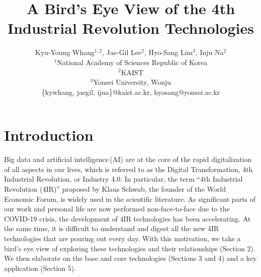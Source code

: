 \documentclass[11pt]{article}
\begin{document}
\title{A Bird’s Eye View of the 4th Industrial Revolution Technologies}
\author{Kyu-Young Whang$^{1,2}$, Jae-Gil Lee$^2$, Hyo-Sang Lim$^3$, Inju Na$^2$ \\
$^1$National Academy of Sciences Republic of Korea \\
$^2$KAIST \\
$^3$Yonsei University, Wonju \\
{\small \{kywhang, jaegil, ijna\}@kaist.ac.kr, hyosang@yonsei.ac.kr}}
\maketitle
\setcounter{page}{4}

\section{Introduction}

Big data and artificial intelligence\,(AI) are at the core of the rapid digitalization of all aspects in our lives, which is referred to as the Digital Transformation, 4th Industrial Revolution, or Industry 4.0. In particular, the term ``4th Industrial Revolution (4IR)'' proposed by Klaus Schwab, the founder of the World Economic Forum, is widely used in the scientific literature. As significant parts of our work and personal life are now performed non-face-to-face due to the COVID-19 crisis, the development of 4IR technologies has been accelerating. At the same time, it is difficult to understand and digest all the new 4IR technologies that are pouring out every day. 
With this motivation, we take a bird's eye view of exploring these technologies and their relationships (Section 2). We then elaborate on the base and core technologies (Sections 3 and 4) and a key application (Section 5). 
 
\end{document}
